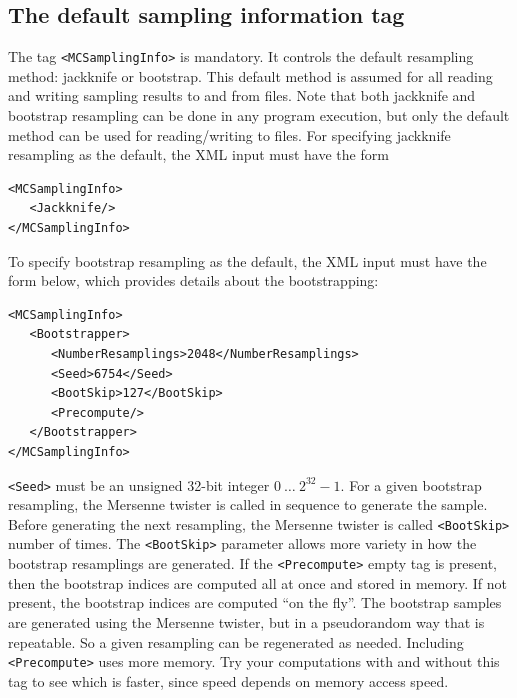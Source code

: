 \documentclass[12pt]{article}
\newcommand{\vb}{\texttt}
\begin{document}
\subsection{The default sampling information tag}
The tag \vb{<MCSamplingInfo>} is mandatory.  It controls the default
resampling method:  jackknife or bootstrap.  This default method
is assumed for all reading and writing sampling results to and
from files.  Note that both jackknife and bootstrap resampling
can be done in any program execution, but only the default method can be used
for reading/writing to files.  For specifying jackknife resampling as
the default, the XML input must have the form
\begin{verbatim}
<MCSamplingInfo>
   <Jackknife/>
</MCSamplingInfo>
\end{verbatim}
To specify bootstrap resampling as the default, the XML input must have the
form below, which provides details about the bootstrapping:
\begin{verbatim}
<MCSamplingInfo>
   <Bootstrapper>
      <NumberResamplings>2048</NumberResamplings>
      <Seed>6754</Seed>
      <BootSkip>127</BootSkip>
      <Precompute/>
   </Bootstrapper>
</MCSamplingInfo>
\end{verbatim}
\vb{<Seed>} must be an unsigned 32-bit integer $0\ \dots\ 2^{32}-1$.
For a given bootstrap resampling, the Mersenne twister is
called in sequence to generate the sample. Before generating
the next resampling, the Mersenne twister is called \vb{<BootSkip>}
number of times. The \vb{<BootSkip>} parameter allows more variety
in how the bootstrap resamplings are generated. If the \vb{<Precompute>}
empty tag is present, then the bootstrap indices are computed all at once
and stored in memory. If not present, the bootstrap indices are computed
``on the fly''. The bootstrap samples are generated using the Mersenne
twister, but in a pseudorandom way that is repeatable. So a given resampling
can be regenerated as needed. Including \vb{<Precompute>} uses more memory.
Try your computations with and without this tag to see which is faster,
since speed depends on memory access speed.
\end{document}
